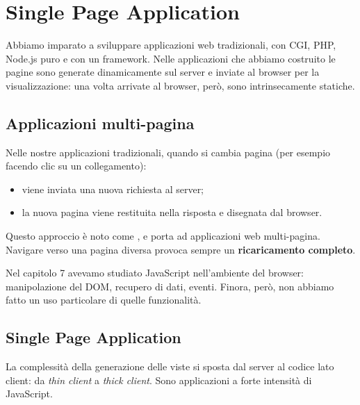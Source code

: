 \chapter{Single Page Application}

Abbiamo imparato a sviluppare applicazioni web tradizionali, con CGI, PHP,
Node.js puro e con un framework. Nelle applicazioni che abbiamo costruito le
pagine sono generate dinamicamente sul server e inviate al browser per la
visualizzazione: una volta arrivate al browser, però, sono intrinsecamente
statiche.

\section{Applicazioni multi-pagina}

Nelle nostre applicazioni tradizionali, quando si cambia pagina (per esempio
facendo clic su un collegamento):

\begin{itemize}
  \item viene inviata una nuova richiesta al server;
  \item la nuova pagina viene restituita nella risposta e disegnata dal browser.
\end{itemize}

Questo approccio è noto come , e porta ad applicazioni web
multi-pagina. Navigare verso una pagina diversa provoca sempre un
\textbf{ricaricamento completo}.

Nel capitolo 7 avevamo studiato JavaScript nell'ambiente del browser:
manipolazione del DOM, recupero di dati, eventi. Finora, però, non abbiamo fatto
un uso particolare di quelle funzionalità.

\section{Single Page Application}


La complessità della generazione delle viste si sposta dal server al codice
lato client: da \textit{thin client} a \textit{thick client}. Sono applicazioni
a forte intensità di JavaScript.

